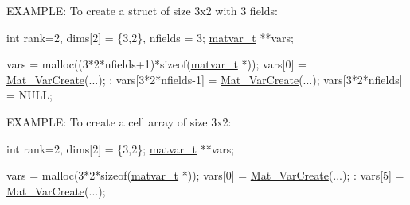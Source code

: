 E\+X\+A\+M\+P\+LE\+: To create a struct of size 3x2 with 3 fields\+: 
\begin{DoxyCode}
\textcolor{keywordtype}{int} rank=2, dims[2] = \{3,2\}, nfields = 3;
\hyperlink{group___m_a_t_structmatvar__t}{matvar\_t} **vars;

vars = malloc((3*2*nfields+1)*\textcolor{keyword}{sizeof}(\hyperlink{group___m_a_t_structmatvar__t}{matvar\_t} *));
vars[0]             = \hyperlink{group___m_a_t_ga1c54a84bb4d810c6fccdb8869489eac4}{Mat\_VarCreate}(...);
   :
vars[3*2*nfields-1] = \hyperlink{group___m_a_t_ga1c54a84bb4d810c6fccdb8869489eac4}{Mat\_VarCreate}(...);
vars[3*2*nfields]   = NULL;
\end{DoxyCode}


E\+X\+A\+M\+P\+LE\+: To create a cell array of size 3x2\+: 
\begin{DoxyCode}
\textcolor{keywordtype}{int} rank=2, dims[2] = \{3,2\};
\hyperlink{group___m_a_t_structmatvar__t}{matvar\_t} **vars;

vars = malloc(3*2*\textcolor{keyword}{sizeof}(\hyperlink{group___m_a_t_structmatvar__t}{matvar\_t} *));
vars[0]             = \hyperlink{group___m_a_t_ga1c54a84bb4d810c6fccdb8869489eac4}{Mat\_VarCreate}(...);
   :
vars[5] = \hyperlink{group___m_a_t_ga1c54a84bb4d810c6fccdb8869489eac4}{Mat\_VarCreate}(...);
\end{DoxyCode}




